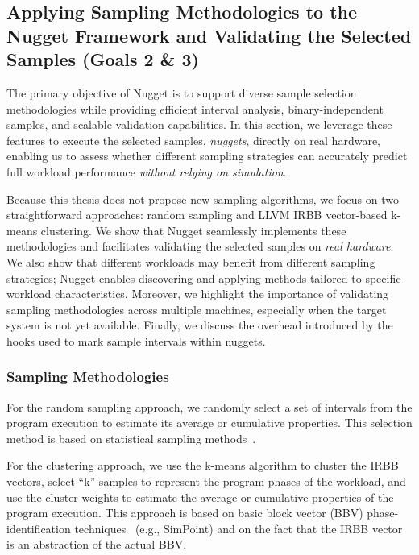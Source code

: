 \subsection{Applying Sampling Methodologies to the Nugget Framework and Validating the Selected Samples (Goals 2 \& 3)}
\label{sec:sampling_methodology_validation}

The primary objective of Nugget is to support diverse sample selection methodologies while providing efficient interval analysis, binary-independent samples, and scalable validation capabilities.
In this section, we leverage these features to execute the selected samples, \emph{nuggets}, directly on real hardware, enabling us to assess whether different sampling strategies can accurately predict full workload performance \emph{without relying on simulation}.

Because this thesis does not propose new sampling algorithms, we focus on two straightforward approaches: random sampling and LLVM IRBB vector-based k-means clustering.
We show that Nugget seamlessly implements these methodologies and facilitates validating the selected samples on \emph{real hardware}.
We also show that different workloads may benefit from different sampling strategies; Nugget enables discovering and applying methods tailored to specific workload characteristics.
Moreover, we highlight the importance of validating sampling methodologies across multiple machines, especially when the target system is not yet available.
Finally, we discuss the overhead introduced by the hooks used to mark sample intervals within nuggets.

\subsubsection{Sampling Methodologies}
\label{sec:sampling_methodology}

For the random sampling approach, we randomly select a set of intervals from the program execution to estimate its average or cumulative properties.
This selection method is based on statistical sampling methods~\cite{smarts}.

For the clustering approach, we use the k-means algorithm to cluster the IRBB vectors, select ``k'' samples to represent the program phases of the workload, and use the cluster weights to estimate the average or cumulative properties of the program execution.
This approach is based on basic block vector (BBV) phase-identification techniques~\cite{survey_phase_classification} (e.g., SimPoint) and on the fact that the IRBB vector is an abstraction of the actual BBV.

